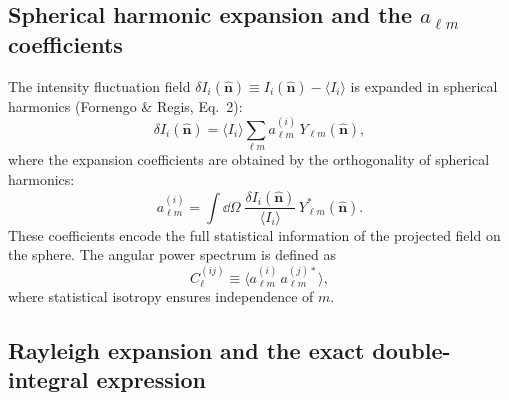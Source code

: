 \documentclass[10pt,a4paper]{article}
\newcommand{\Cl}{C_\ell}
\newcommand{\alm}{a_{\ell m}}
\newcommand{\Ylm}{Y_{\ell m}}
\newcommand{\nhat}{\hat{\mathbf{n}}}
\begin{document}
\subsection{Spherical harmonic expansion and the $\alm$ coefficients}

The intensity fluctuation field $\delta I_i(\nhat) \equiv I_i(\nhat) - \langle I_i \rangle$ is expanded in spherical harmonics (Fornengo \& Regis, Eq.~2):
\begin{equation}
\label{eq:sph_harm_expansion}
\delta I_i(\nhat) = \langle I_i \rangle \sum_{\ell m} \alm^{(i)} \, \Ylm(\nhat),
\end{equation}
where the expansion coefficients are obtained by the orthogonality of spherical harmonics:
\begin{equation}
\label{eq:alm_def}
\alm^{(i)} = \int \dd\Omega \; \frac{\delta I_i(\nhat)}{\langle I_i \rangle} \, \Ylm^*(\nhat).
\end{equation}
These coefficients encode the full statistical information of the projected field on the sphere. The angular power spectrum is defined as
\begin{equation}
\label{eq:Cl_def}
\Cl^{(ij)} \equiv \langle \alm^{(i)} \, \alm^{(j)*} \rangle,
\end{equation}
where statistical isotropy ensures independence of $m$.

\subsection{Rayleigh expansion and the exact double-integral expression}
\end{document}

